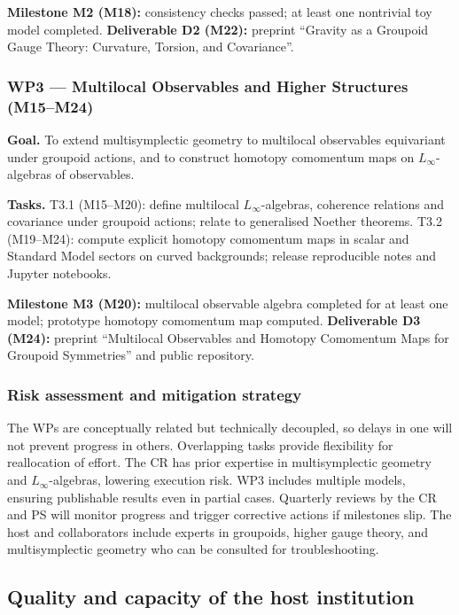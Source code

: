 \documentclass[11pt]{msca-pf}
\begin{document}
\textbf{Milestone M2 (M18):} consistency checks passed; at least one nontrivial toy model completed.  
\textbf{Deliverable D2 (M22):} preprint “Gravity as a Groupoid Gauge Theory: Curvature, Torsion, and Covariance”.  

\subsubsection*{WP3 — Multilocal Observables and Higher Structures (M15–M24)}
\textbf{Goal.} To extend multisymplectic geometry to multilocal observables equivariant under groupoid actions, and to construct homotopy comomentum maps on $L_\infty$-algebras of observables.  

\textbf{Tasks.}  
T3.1 (M15–M20): define multilocal $L_\infty$-algebras, coherence relations and covariance under groupoid actions; relate to generalised Noether theorems.  
T3.2 (M19–M24): compute explicit homotopy comomentum maps in scalar and Standard Model sectors on curved backgrounds; release reproducible notes and Jupyter notebooks.  

\textbf{Milestone M3 (M20):} multilocal observable algebra completed for at least one model; prototype homotopy comomentum map computed.  
\textbf{Deliverable D3 (M24):} preprint “Multilocal Observables and Homotopy Comomentum Maps for Groupoid Symmetries” and public repository.  

\subsubsection*{Risk assessment and mitigation strategy}
The WPs are conceptually related but technically decoupled, so delays in one will not prevent progress in others. Overlapping tasks provide flexibility for reallocation of effort. The CR has prior expertise in multisymplectic geometry and $L_\infty$-algebras, lowering execution risk. WP3 includes multiple models, ensuring publishable results even in partial cases. Quarterly reviews by the CR and PS will monitor progress and trigger corrective actions if milestones slip. The host and collaborators include experts in groupoids, higher gauge theory, and multisymplectic geometry who can be consulted for troubleshooting.  


\subsection{Quality and capacity of the host institution}
\label{ssc:implementation: host}
\end{document}
